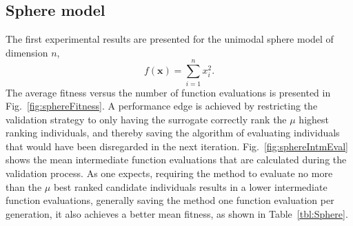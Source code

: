 \documentclass[10pt, conference]{IEEEtran} %
\renewcommand{\vec}[1]{\mathbf{#1}}
\begin{document}
\subsection{Sphere model}\label{sec:sphere}
The first experimental results are presented for the unimodal sphere model of dimension $n$, 
\begin{equation} f(\vec{x}) = \sum_{i=1}^nx_i^2.\end{equation}
The average fitness versus the number of function evaluations is presented in Fig.~\ref{fig:sphereFitness}. A performance edge is achieved by restricting the validation strategy to only having the surrogate correctly rank the $\mu$ highest ranking individuals, and thereby saving the algorithm of evaluating individuals  that would have been disregarded in the next iteration. Fig.~\ref{fig:sphereIntmEval} shows the mean intermediate function evaluations that are calculated during the validation process. As one expects, requiring the method to evaluate no more than the $\mu$ best ranked candidate individuals results in a lower intermediate function evaluations, generally saving the method one function evaluation per generation, it also achieves a better mean fitness, as shown in Table~\ref{tbl:Sphere}.
\end{document}
